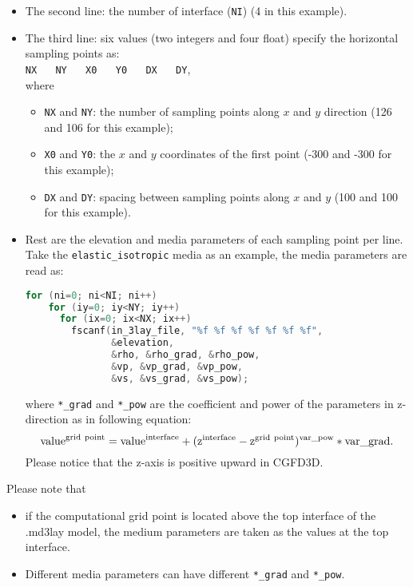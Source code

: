 \begin{itemize}
\begin{itemize}
    \end{itemize}

  \item The second line: the number of interface (\texttt{NI}) (4 in this example).

  \item The third line:
    six values (two integers and four float) specify the horizontal sampling points as:\\
    \texttt{NX} ~~ \texttt{NY} ~~ \texttt{X0} ~~ \texttt{Y0} ~~ \texttt{DX} ~~ \texttt{DY}, \\
    where
    \begin{itemize}
      \item \texttt{NX} and \texttt{NY}:
          the number of sampling points along $x$ and $y$ direction (126 and 106 for this example);
      \item \texttt{X0} and \texttt{Y0}: 
        the $x$ and $y$ coordinates of the first point (-300 and -300 for this example);
      \item \texttt{DX} and \texttt{DY}:
        spacing between sampling points along $x$ and $y$ (100 and 100 for this example).
    \end{itemize}

 \item 
  Rest are the elevation and media parameters of each sampling point per line.
  Take the \texttt{elastic\_isotropic} media as an example, the media parameters are read as:
  \begin{lstlisting}[language = C]
  for (ni=0; ni<NI; ni++)
    for (iy=0; iy<NY; iy++) 
      for (ix=0; ix<NX; ix++) 
        fscanf(in_3lay_file, "%f %f %f %f %f %f %f", 
               &elevation,
               &rho, &rho_grad, &rho_pow,
               &vp, &vp_grad, &vp_pow,
               &vs, &vs_grad, &vs_pow);
  \end{lstlisting}
  where \texttt{*\_grad} and \texttt{*\_pow} are the coefficient and power of the parameters
    in z-direction as in following equation:
   \begin{equation*}
     \rm{value}^{\rm{grid~point}} = \rm{value}^{\rm{interface}}
        + (z^{\rm{interface}}-z^{\rm{grid~point}})^{var\_pow} * var\_grad.
   \end{equation*}
   Please notice that the z-axis is positive upward in CGFD3D.

\end{itemize}

Please note that
\begin{itemize}
  \item if the computational grid point is located above the top interface of the .md3lay model,
the medium parameters are taken as the values at the top interface.
  \item Different media parameters can have different \texttt{*\_grad} and \texttt{*\_pow}.
\end{itemize}

